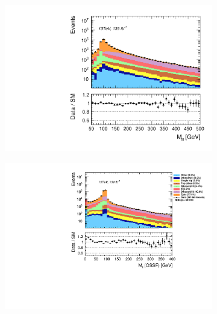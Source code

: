 \begin{figure}[H]
{\begin{subfigure}{.405\textwidth}
        \includegraphics[width=\textwidth]{Figures/FeaturesHistograms/mlll.pdf}
        \caption{}
        \label{fig:mlll}
    \end{subfigure}
    \hfill
    \begin{subfigure}{.525\textwidth}
        \includegraphics[width=\textwidth]{Figures/FeaturesHistograms/mll_OSSF.pdf}
        \caption{}
        \label{fig:mll_OSSF}
    \end{subfigure}
    }
\end{figure}

